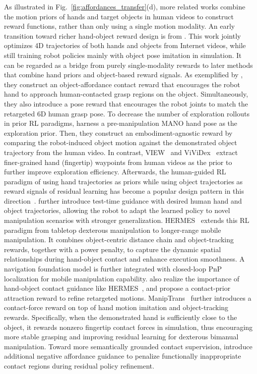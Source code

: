 \documentclass[Afour,sageh,times]{sagej}
\begin{document}
As illustrated in Fig.~\ref{fig:affordances_transfer}(d), more related works combine the motion priors of hands and target objects in human videos to construct reward functions, rather than only using a single motion modality. An early transition toward richer hand-object reward design is from \cite{patel2022learning}. This work jointly optimizes 4D trajectories of both hands and objects from Internet videos, while still training robot policies mainly with object pose imitation in simulation. It can be regarded as a bridge from purely single-modality rewards to later methods that combine hand priors and object-based reward signals. As exemplified by \cite{mandikal2022dexvip}, they construct an object-affordance contact reward that encourages the robot hand to approach human-contacted grasp regions on the object. Simultaneously, they also introduce a pose reward that encourages the robot joints to match the retargeted 6D human grasp pose. To decrease the number of exploration rollouts in prior RL paradigms, \cite{lum2025crossing} harness a pre-manipulation MANO hand pose as the exploration prior. Then, they construct an embodiment-agnostic reward by comparing the robot-induced object motion against the demonstrated object trajectory from the human video. In contrast, VIEW~\citep{jonnavittula2025view} and ViViDex~\citep{chen2025vividex} extract finer-grained hand (fingertip) waypoints from human videos as the prior to further improve exploration efficiency. Afterwards, the human-guided RL paradigm of using hand trajectories as priors while using object trajectories as reward signals of residual learning has become a popular design pattern in this direction~\citep{guzey2025bridging,zhao2025dexh2r,yuan2025hermes,hsieh2025dexman}. \cite{zhao2025dexh2r} further introduce test-time guidance with desired human hand and object trajectories, allowing the robot to adapt the learned policy to novel manipulation scenarios with stronger generalization. HERMES~\citep{yuan2025hermes} extends this RL paradigm from tabletop dexterous manipulation to longer-range mobile manipulation. It combines object-centric distance chain and object-tracking rewards, together with a power penalty, to capture the dynamic spatial relationships during hand-object contact and enhance execution smoothness. A navigation foundation model is further integrated with closed-loop PnP localization for mobile manipulation capability. \cite{hsieh2025dexman} also realize the importance of hand-object contact guidance like HERMES~\citep{yuan2025hermes}, and propose a contact-prior attraction reward to refine retargeted motions. ManipTrans~\citep{li2025maniptrans} further introduces a contact-force reward on top of hand motion imitation and object-tracking rewards. Specifically, when the demonstrated hand is sufficiently close to the object, it rewards nonzero fingertip contact forces in simulation, thus encouraging more stable grasping and improving residual learning for dexterous bimanual manipulation. Toward more semantically grounded contact supervision, \cite{zhao2025towards} introduce additional negative affordance guidance to penalize functionally inappropriate contact regions during residual policy refinement. 
\end{document}

